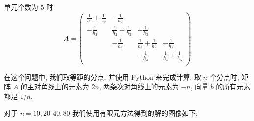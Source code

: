\documentclass[UTF8]{article}
\begin{document}
    单元个数为 5 时
    \[
        A =
        \begin{pmatrix}
            \frac{1}{h_1}+\frac{1}{h_2} & -\frac{1}{h_2} \\
            -\frac{1}{h_2} & \frac{1}{h_2}+\frac{1}{h_3} & -\frac{1}{h_3} \\
            & -\frac{1}{h_3} & \frac{1}{h_3}+\frac{1}{h_4} & -\frac{1}{h_4}              \\
            &                & -\frac{1}{h_4}              & \frac{1}{h_4}+\frac{1}{h_5} \\
        \end{pmatrix}
    \]

    在这个问题中, 我们取等距的分点, 并使用 Python 来完成计算.
    取 $n$ 个分点时, 矩阵 $A$ 的主对角线上的元素为 $2n$, 两条次对角线上的元素为 $-n$, 向量 $b$ 的所有元素都是 $1/n$.

    对于 $n = 10,20,40,80$ 我们使用有限元方法得到的解的图像如下:
\end{document}
